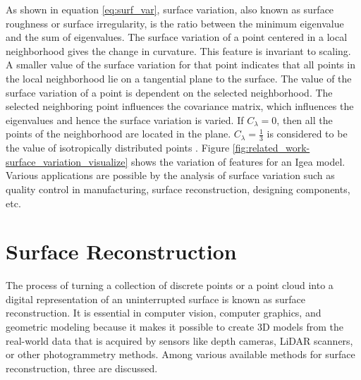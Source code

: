 As shown in equation \ref{eq:surf_var}, surface variation, also known as surface roughness or surface irregularity, is the ratio between the minimum eigenvalue and the sum of eigenvalues. The surface variation of a point centered in a local neighborhood gives the change in curvature. This feature is invariant to scaling. A smaller value of the surface variation for that point indicates that all points in the local neighborhood lie on a tangential plane to the surface. The value of the surface variation of a point is dependent on the selected neighborhood. The selected neighboring point influences the covariance matrix, which influences the eigenvalues and hence the surface variation is varied. If \(C_{\lambda} = 0 \), then all the points of the neighborhood are located in the plane. \(C_{\lambda} = \frac{1}{3} \) is considered to be the value of isotropically distributed points \parencite{pauly2002efficient}. Figure \ref{fig:related_work-surface_variation_visualize} shows the variation of features for an Igea model. Various applications are possible by the analysis of surface variation such as quality control in manufacturing, surface reconstruction, designing components, etc.

\section{Surface Reconstruction}
The process of turning a collection of discrete points or a point cloud into a digital representation of an uninterrupted surface is known as surface reconstruction. It is essential in computer vision, computer graphics, and geometric modeling because it makes it possible to create 3D models from the real-world data that is acquired by sensors like depth cameras, LiDAR scanners, or other photogrammetry methods. Among various available methods for surface reconstruction, three are discussed.

